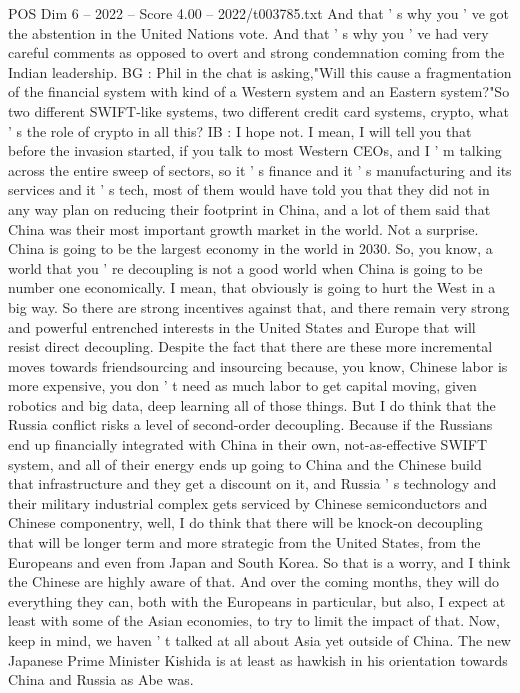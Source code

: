 \begin{textsample}{POS Dim 6 – 2022 – Score 4.00 – 2022/t003785.txt}
And that ' s why you ' ve got the abstention in the United Nations vote.
And that ' s why you ' ve had very careful comments as opposed to overt and strong condemnation coming from the Indian leadership.
BG : Phil in the chat is asking,"Will this cause a fragmentation of the financial system with kind of a Western system and an Eastern system?"So two different SWIFT-like systems, two different credit card systems, crypto, what ' s the role of crypto in all this?
IB : I hope not.
I mean, I will tell you that before the invasion started, if you talk to most Western CEOs, and I ' m talking across the entire sweep of sectors, so it ' s finance and it ' s manufacturing and its services and it ' s tech, most of them would have told you that they did not in any way plan on reducing their footprint in China, and a lot of them said that China was their most important growth market in the world.
Not a surprise.
China is going to be the largest economy in the world in 2030.
So, you know, a world that you ' re decoupling is not a good world when China is going to be number one economically.
I mean, that obviously is going to hurt the West in a big way.
So there are strong incentives against that, and there remain very strong and powerful entrenched interests in the United States and Europe that will resist direct decoupling.
Despite the fact that there are these more incremental moves towards friendsourcing and insourcing because, you know, Chinese labor is more expensive, you don ' t need as much labor to get capital moving, given robotics and big data, deep learning all of those things.
But I do think that the Russia conflict risks a level of second-order decoupling.
Because if the Russians end up financially integrated with China in their own, not-as-effective SWIFT system, and all of their energy ends up going to China and the Chinese build that infrastructure and they get a discount on it, and Russia ' s technology and their military industrial complex gets serviced by Chinese semiconductors and Chinese componentry, well, I do think that there will be knock-on decoupling that will be longer term and more strategic from the United States, from the Europeans and even from Japan and South Korea.
So that is a worry, and I think the Chinese are highly aware of that.
And over the coming months, they will do everything they can, both with the Europeans in particular, but also, I expect at least with some of the Asian economies, to try to limit the impact of that.
Now, keep in mind, we haven ' t talked at all about Asia yet outside of China.
The new Japanese Prime Minister Kishida is at least as hawkish in his orientation towards China and Russia as Abe was.

\end{textsample}

